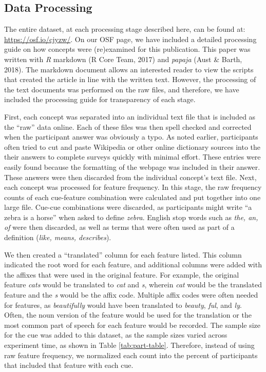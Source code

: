 \documentclass[english,,man]{apa6}
\theoremstyle{definition}
\theoremstyle{definition}
\theoremstyle{definition}
\theoremstyle{remark}
\begin{document}
\hypertarget{data-processing}{%
\subsection{Data Processing}\label{data-processing}}

The entire dataset, at each processing stage described here, can be
found at: \url{https://osf.io/cjyzw/}. On our OSF page, we have included
a detailed processing guide on how concepts were (re)examined for this
publication. This paper was written with \emph{R} markdown (R Core Team,
2017) and \emph{papaja} (Aust \& Barth, 2018). The markdown document
allows an interested reader to view the scripts that created the article
in line with the written text. However, the processing of the text
documents was performed on the raw files, and therefore, we have
included the processing guide for transparency of each stage.

First, each concept was separated into an individual text file that is
included as the \enquote{raw} data online. Each of these files was then
spell checked and corrected when the participant answer was obviously a
typo. As noted earlier, participants often tried to cut and paste
Wikipedia or other online dictionary sources into the their answers to
complete surveys quickly with minimal effort. These entries were easily
found because the formatting of the webpage was included in their
answer. These answers were then discarded from the individual concept's
text file. Next, each concept was processed for feature frequency. In
this stage, the raw frequency counts of each cue-feature combination
were calculated and put together into one large file. Cue-cue
combinations were discarded, as participants might write \enquote{a
zebra is a horse} when asked to define \emph{zebra}. English stop words
such as \emph{the, an, of} were then discarded, as well as terms that
were often used as part of a definition (\emph{like, means, describes}).

We then created a \enquote{translated} column for each feature listed.
This column indicated the root word for each feature, and additional
columns were added with the affixes that were used in the original
feature. For example, the original feature \emph{cats} would be
translated to \emph{cat} and \emph{s}, wherein \emph{cat} would be the
translated feature and the \emph{s} would be the affix code. Multiple
affix codes were often needed for features, as \emph{beautifully} would
have been translated to \emph{beauty}, \emph{ful}, and \emph{ly}. Often,
the noun version of the feature would be used for the translation or the
most common part of speech for each feature would be recorded. The
sample size for the cue was added to this dataset, as the sample sizes
varied across experiment time, as shown in Table \ref{tab:part-table}.
Therefore, instead of using raw feature frequency, we normalized each
count into the percent of participants that included that feature with
each cue.
\end{document}
